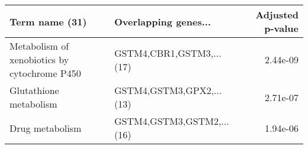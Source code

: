 \begin{tabular}{llr}
\toprule
                              Term name (31) &      Overlapping genes... &  Adjusted p-value \\
\midrule
Metabolism of xenobiotics by cytochrome P450 &  GSTM4,CBR1,GSTM3,...(17) &          2.44e-09 \\
                      Glutathione metabolism &  GSTM4,GSTM3,GPX2,...(13) &          2.71e-07 \\
                             Drug metabolism & GSTM4,GSTM3,GSTM2,...(16) &          1.94e-06 \\
\bottomrule
\end{tabular}
